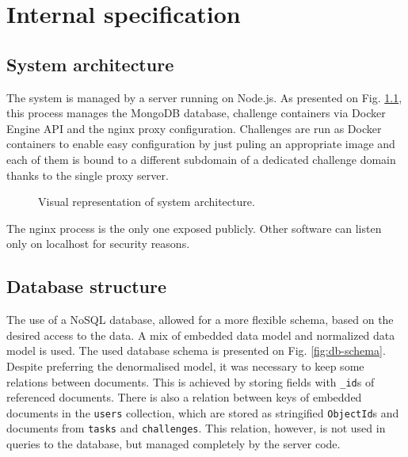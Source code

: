 \chapter{Internal specification}


\section{System architecture}

The system is managed by a server running on Node.js. As presented on Fig. \ref{fig:system-architecture}, this process manages the MongoDB database, challenge containers via Docker Engine API and the nginx proxy configuration. Challenges are run as Docker containers to enable easy configuration by just puling an appropriate image and each of them is bound to a different subdomain of a dedicated challenge domain thanks to the single proxy server.

\begin{figure}
    \centering
    
    \caption{Visual representation of system architecture.}
    \label{fig:system-architecture}
\end{figure}

The nginx process is the only one exposed publicly. Other software can listen only on localhost for security reasons.

\section{Database structure}

The use of a NoSQL database, allowed for a more flexible schema, based on the desired access to the data. A mix of embedded data model and normalized data model is used. The used database schema is presented on Fig. \ref{fig:db-schema}. Despite preferring the denormalised model, it was necessary to keep some relations between documents. This is achieved by storing fields with \texttt{\_id}s of referenced documents. There is also a relation between keys of embedded documents in the \texttt{users} collection, which are stored as stringified \texttt{ObjectId}s and documents from \texttt{tasks} and \texttt{challenges}. This relation, however, is not used in queries to the database, but managed completely by the server code.

